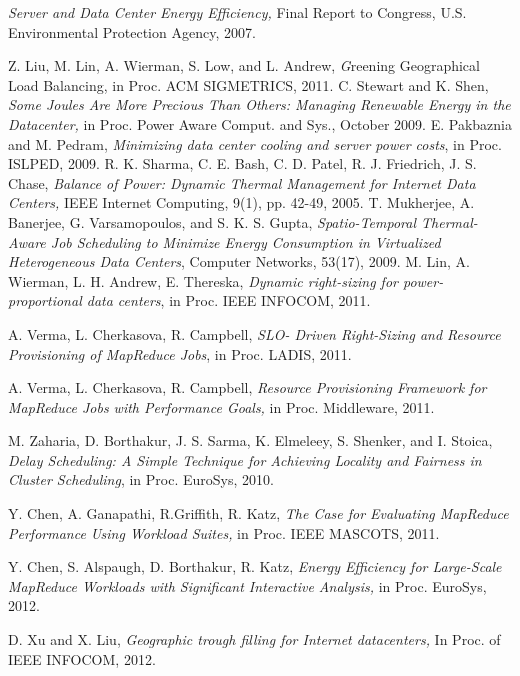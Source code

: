 \documentclass[10pt,conference,compsocconf,letterpaper]{IEEEtran}
\begin{document}
{\small{




\begin{thebibliography}{1}
\emph{Server and Data Center Energy Efficiency,} Final Report to Congress, U.S. Environmental Protection
Agency, 2007.

Z. Liu, M. Lin, A. Wierman, S. Low, and L. Andrew, {\emph Greening Geographical Load Balancing,} in Proc. ACM
SIGMETRICS, 2011.
C. Stewart and K. Shen, \emph{Some Joules Are More Precious Than Others: Managing Renewable Energy in the
Datacenter,} in Proc. Power Aware Comput. and Sys., October 2009.
E. Pakbaznia and M. Pedram, \emph{Minimizing data center cooling and server power costs}, in Proc. ISLPED, 2009.
R. K. Sharma, C. E. Bash, C. D. Patel, R. J. Friedrich, J. S. Chase, \emph{Balance of Power: Dynamic Thermal Management for Internet Data Centers,} IEEE Internet Computing, 9(1), pp. 42-49, 2005.
T. Mukherjee, A. Banerjee, G. Varsamopoulos, and S. K. S. Gupta, \emph{Spatio-Temporal Thermal-Aware Job Scheduling to Minimize Energy Consumption in Virtualized Heterogeneous Data Centers}, Computer Networks, 53(17), 2009.
M. Lin, A. Wierman, L. H. Andrew, E. Thereska, \emph{Dynamic right-sizing for power-proportional data centers}, in Proc. IEEE INFOCOM, 2011.

A. Verma, L. Cherkasova, R. Campbell, \emph{SLO- Driven Right-Sizing and Resource Provisioning of MapReduce Jobs}, in Proc. LADIS, 2011.

A. Verma, L. Cherkasova, R. Campbell, \emph{Resource Provisioning Framework for MapReduce Jobs with Performance Goals,} in Proc. Middleware, 2011.


M. Zaharia, D. Borthakur, J. S. Sarma, K. Elmeleey, S. Shenker, and I. Stoica, \emph{Delay Scheduling: A Simple Technique for Achieving Locality and Fairness in Cluster Scheduling}, in Proc. EuroSys, 2010.

Y. Chen, A. Ganapathi, R.Griffith, R. Katz, \emph{The Case for Evaluating MapReduce Performance Using Workload Suites,}
in Proc. IEEE MASCOTS, 2011.

Y. Chen, S. Alspaugh, D. Borthakur, R. Katz, \emph{Energy Efficiency for Large-Scale MapReduce Workloads with Significant Interactive Analysis,} in Proc. EuroSys, 2012.

D. Xu and X. Liu, \emph{Geographic trough filling for Internet datacenters,} In Proc. of IEEE INFOCOM, 2012.



\end{thebibliography}}}
\end{document}
